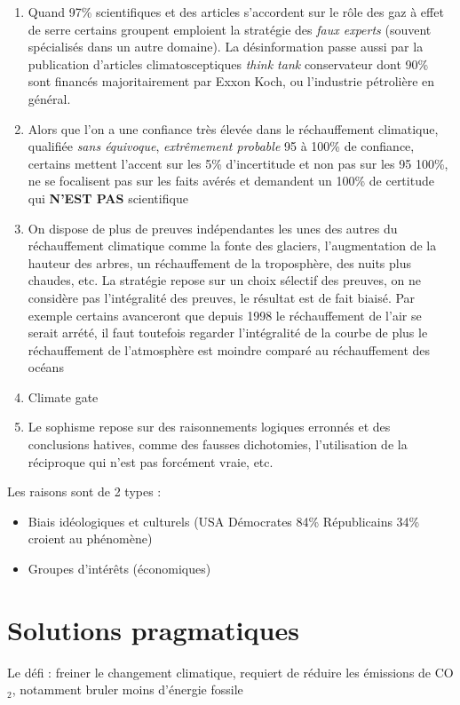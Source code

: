 \documentclass {article}
\newcommand{\V}[0]{\vspace{1\baselineskip}}
\begin{document}
\begin{enumerate}
\item Quand 97\% scientifiques et des articles s'accordent sur le rôle des gaz à effet de serre certains groupent emploient la stratégie des \emph{faux experts} (souvent spécialisés dans un autre domaine). La désinformation passe aussi par la publication d'articles climatosceptiques \emph{think tank} conservateur dont 90\% sont financés majoritairement par Exxon Koch, ou l'industrie pétrolière en général.
\item Alors que l'on a une confiance très élevée dans le réchauffement climatique, qualifiée \emph{sans équivoque}, \emph{extrêmement probable} 95 à 100\% de confiance,
certains mettent l'accent sur les 5\% d'incertitude et non pas sur les 95 100\%, ne se focalisent pas sur les faits avérés et demandent un 100\% de certitude qui \textbf{N'EST PAS} scientifique
\item On dispose de plus de preuves indépendantes les unes des autres du réchauffement climatique comme la fonte des glaciers, l'augmentation de la hauteur des arbres, un réchauffement de la troposphère, des nuits plus chaudes, etc. 
La stratégie repose sur un choix sélectif des preuves, on ne considère pas l'intégralité des preuves, le résultat est de fait biaisé. 
Par exemple certains avanceront que depuis 1998 le réchauffement de l'air se serait arrété, il faut toutefois regarder l'intégralité de la courbe de plus le réchauffement de l'atmosphère est moindre comparé au réchauffement des océans
\item Climate gate
\item Le sophisme repose sur des raisonnements logiques erronnés et des conclusions hatives, comme des fausses dichotomies, l'utilisation de la réciproque qui n'est pas forcément vraie, etc.
\end{enumerate}
\V

Les raisons sont de 2 types :
\begin{itemize}
\item Biais idéologiques et culturels (USA Démocrates 84\% Républicains 34\% croient au phénomène)
\item Groupes d'intérêts (économiques)
\end{itemize}
\bigskip

\section{Solutions pragmatiques}
\bigskip
Le défi : freiner le changement climatique, requiert de réduire les émissions de CO$_2$, notamment bruler moins d'énergie fossile
\V
\end{document}

